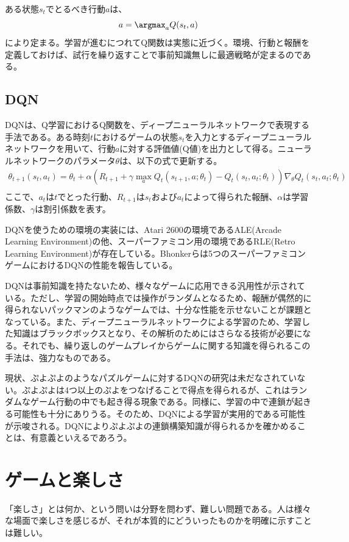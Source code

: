 \documentclass[12pt]{jarticle}
\begin{document}
ある状態$s_t$でとるべき行動$a$は、
\[
a = \argmax_a Q(s_t, a)
\]
により定まる。学習が進むにつれてQ関数は実態に近づく。環境、行動と報酬を定義しておけば、試行を繰り返すことで事前知識無しに最適戦略が定まるのである。

\subsection{DQN}
DQNは、Q学習におけるQ関数を、ディープニューラルネットワークで表現する手法である。ある時刻$t$におけるゲームの状態$s_t$を入力とするディープニューラルネットワークを用いて、行動$a$に対する評価値(Q値)を出力として得る。ニューラルネットワークのパラメータ$\theta$は、以下の式で更新する。
\begin{eqnarray}
\theta_{t+1}(s_t, a_t) = \theta_t + \alpha (R_{t+1} + \gamma \max_a Q_t(s_{t+1}, a; \theta_t) - Q_t(s_t, a_t; \theta_t))\nabla_\theta Q_t(s_t, a_t; \theta_t) \nonumber\\
\end{eqnarray}
ここで、$a_t$は$t$でとった行動、$R_{t+1}$は$s_t$および$a_t$によって得られた報酬、$\alpha$は学習係数、$\gamma$は割引係数を表す。

DQNを使うための環境の実装には、Atari 2600の環境であるALE(Arcade Learning Environment)\cite{ALE}の他、スーパーファミコン用の環境であるRLE(Retro Learning Environment)\cite{RLE}が存在している。Bhonkerらは5つのスーパーファミコンゲームにおけるDQNの性能を報告している\cite{RLE}。

DQNは事前知識を持たないため、様々なゲームに応用できる汎用性が示されている。ただし、学習の開始時点では操作がランダムとなるため、報酬が偶然的に得られないパックマンのようなゲームでは、十分な性能を示せないことが課題となっている。また、ディープニューラルネットワークによる学習のため、学習した知識はブラックボックスとなり、その解析のためにはさらなる技術が必要になる。それでも、繰り返しのゲームプレイからゲームに関する知識を得られるこの手法は、強力なものである。

現状、ぷよぷよのようなパズルゲームに対するDQNの研究は未だなされていない。ぷよぷよは4つ以上のぷよをつなげることで得点を得られるが、これはランダムなゲーム行動の中でも起き得る現象である。同様に、学習の中で連鎖が起きる可能性も十分にありうる。そのため、DQNによる学習が実用的である可能性が示唆される。DQNによりぷよぷよの連鎖構築知識が得られるかを確かめることは、有意義といえるであろう。

\section{ゲームと楽しさ}
「楽しさ」とは何か、という問いは分野を問わず、難しい問題である。人は様々な場面で楽しさを感じるが、それが本質的にどういったものかを明確に示すことは難しい。
\end{document}
